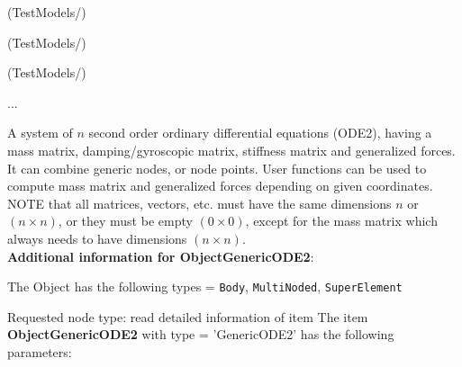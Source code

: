 \item {} (TestModels/)
\item {} (TestModels/)
\item {} (TestModels/)
\item  ...

\ei

%
\newpage

\label{sec:item:ObjectGenericODE2}
A system of $n$ second order ordinary differential equations (ODE2), having a mass matrix, damping/gyroscopic matrix, stiffness matrix and generalized forces. It can combine generic nodes, or node points. User functions can be used to compute mass matrix and generalized forces depending on given coordinates. NOTE that all matrices, vectors, etc. must have the same dimensions $n$ or $(n \times n)$, or they must be empty $(0 \times 0)$, except for the mass matrix which always needs to have dimensions $(n \times n)$.\vspace{12pt}
 \\{\bf Additional information for ObjectGenericODE2}:
\bi
  \item The Object has the following types = \texttt{Body}, \texttt{MultiNoded}, \texttt{SuperElement}
  \item Requested node type: read detailed information of item
\ei
\vspace{12pt} \noindent The item {\bf ObjectGenericODE2} with type = 'GenericODE2' has the following parameters:\vspace{-1cm}\\ 

